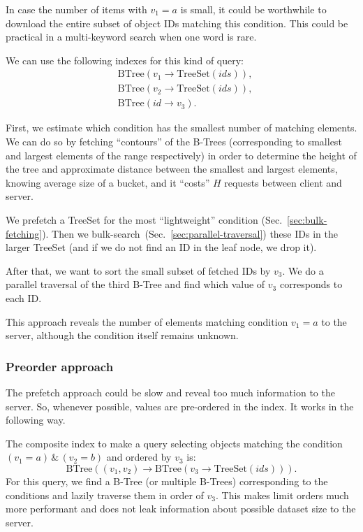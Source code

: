 \documentclass[notitlepage]{revtex4-1}
\begin{document}
In case the number of items with $v_1=a$ is small, it could be worthwhile to download the entire subset of object IDs matching this condition.
This could be practical in a multi-keyword search when one word is rare.

We can use the following indexes for this kind of query:
\begin{align*}
    & \mbox{BTree}(v_1 \rightarrow \mbox{TreeSet}(ids)),\\
    & \mbox{BTree}(v_2 \rightarrow \mbox{TreeSet}(ids)),\\
    & \mbox{BTree}(id \rightarrow v_3).
\end{align*}

First, we estimate which condition has the smallest number of matching elements.
We can do so by fetching ``contours'' of the B-Trees (corresponding to smallest and largest elements of the range respectively) in order to determine the height of the tree and approximate distance between the smallest and largest elements, knowing average size of a bucket, and it ``costs'' $H$ requests between client and server.

We prefetch a TreeSet for the most ``lightweight'' condition (Sec.~\ref{sec:bulk-fetching}).
Then we bulk-search~(Sec.~\ref{sec:parallel-traversal}) these IDs in the larger TreeSet (and if we do not find an ID in the leaf node, we drop it).

After that, we want to sort the small subset of fetched IDs by $v_3$.
We do a parallel traversal of the third B-Tree and find which value of $v_3$ corresponds to each ID.

This approach reveals the number of elements matching condition $v_1=a$ to the server, although the condition itself remains unknown.

\subsubsection{Preorder approach}

The prefetch approach could be slow and reveal too much information to the server.
So, whenever possible, values are pre-ordered in the index.
It works in the following way.

The composite index to make a query selecting objects matching the condition $(v_1 = a) \,\&\, (v_2 = b)$ and ordered by $v_3$ is:
\begin{equation*}
    \mbox{BTree}((v_1, v_2) \rightarrow \mbox{BTree}(v_3 \rightarrow \mbox{TreeSet}(ids))).
\end{equation*}
For this query, we find a B-Tree (or multiple B-Trees) corresponding to the conditions and lazily traverse them in order of $v_3$.
This makes limit orders much more performant and does not leak information about possible dataset size to the server.
\end{document}
